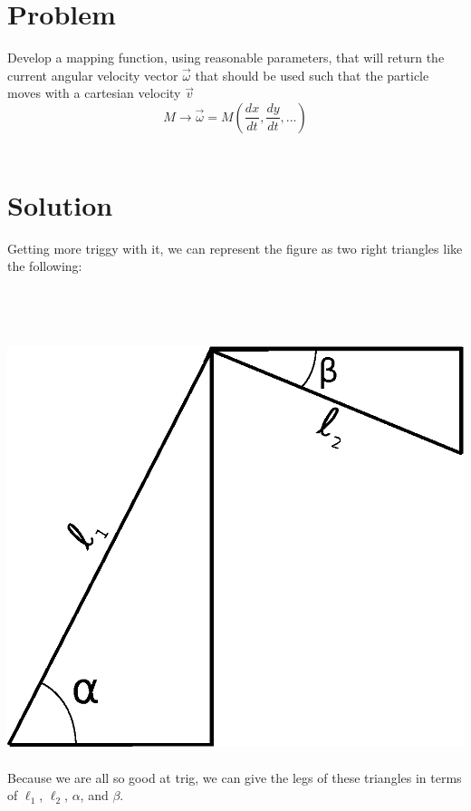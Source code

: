 \documentclass{article}
\begin{document}
\section{Problem}
Develop a mapping function, using reasonable parameters, that will return the current angular velocity vector $\vec{\omega}$ that should be used such that the particle moves with a cartesian velocity $\vec{v}$
\\
\begin{equation*}
M \to \vec{\omega} = M(\frac{dx}{dt}, \frac{dy}{dt}, ...) 
\end{equation*}
\\
\section{Solution}
Getting more triggy with it, we can represent the figure as two right triangles like the following:
\\
\\
\\
\\
\\
\includegraphics[width=450pt]{drawing2.eps}
\\
\\
Because we are all so good at trig, we can give the legs of these triangles in terms of $\ell_1$, $\ell_2$, $\alpha$, and $\beta$.
\\
\\
\\
\end{document}
